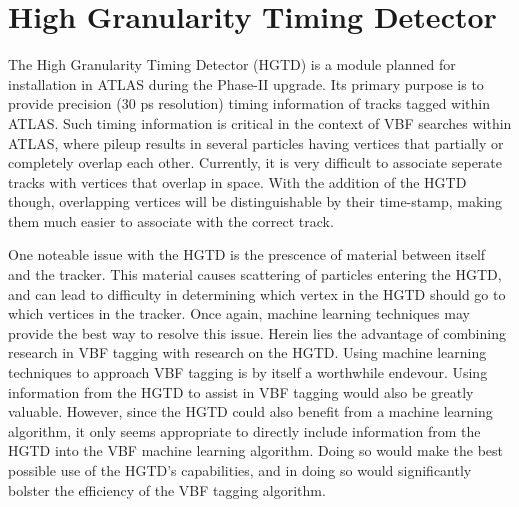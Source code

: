 \documentclass[paper=a4,fontsize=12pt]{article}
\begin{document}
\section*{High Granularity Timing Detector}
    The High Granularity Timing Detector (HGTD) is a module planned for installation in ATLAS during the Phase-II upgrade. Its primary purpose is to provide precision (30 ps resolution) timing information of tracks tagged within ATLAS. Such timing information is critical in the context of VBF searches within ATLAS, where pileup results in several particles having vertices that partially or completely overlap each other. Currently, it is very difficult to associate seperate tracks with vertices that overlap in space. With the addition of the HGTD though, overlapping vertices will be distinguishable by their time-stamp, making them much easier to associate with the correct track. 
    
    One noteable issue with the HGTD is the prescence of material between itself and the tracker. This material causes scattering of particles entering the HGTD, and can lead to difficulty in determining which vertex in the HGTD should go to which vertices in the tracker. Once again, machine learning techniques may provide the best way to resolve this issue. Herein lies the advantage of combining research in VBF tagging with research on the HGTD. Using machine learning techniques to approach VBF tagging is by itself a worthwhile endevour. Using information from the HGTD to assist in VBF tagging would also be greatly valuable. However, since the HGTD could also benefit from a machine learning algorithm, it only seems appropriate to directly include information from the HGTD into the VBF machine learning algorithm. Doing so would make the best possible use of the HGTD's capabilities, and in doing so would significantly bolster the efficiency of the VBF tagging algorithm.



\end{document}
